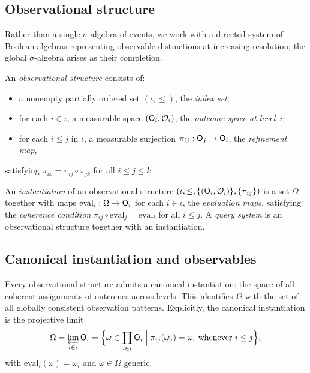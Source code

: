 \subsection{Observational structure}

Rather than a single $\sigma$-algebra of events, we work with a directed system of Boolean algebras representing observable distinctions at increasing resolution; the global $\sigma$-algebra arises as their completion.

\begin{definition}
\label{def:obs-structure}
An \emph{observational structure} consists of:
\begin{itemize}[noitemsep]
  \item a nonempty partially ordered set $(\iota, \leq)$, the \emph{index set};
  \item for each $i \in \iota$, a measurable space $(\mathsf{O}_{i}, \mathcal{O}_i)$,
    the \emph{outcome space at level~$i$};
  \item for each $i \leq j$ in $\iota$, a measurable surjection
    $\pi_{ij} : \mathsf{O}_{j} \to \mathsf{O}_{i}$, the \emph{refinement map},
\end{itemize}
satisfying $\pi_{ik} = \pi_{ij} \circ \pi_{jk}$ for all $i \leq j \leq k$.
\end{definition}

\begin{definition}
\label{def:query-system}
An \emph{instantiation} of an observational structure $(\iota, \leq, \{(\mathsf{O}_{i}, \mathcal{O}_i)\}, \{\pi_{ij}\})$ is a set $\Omega$ together with maps $\mathrm{eval}_i : \Omega \to \mathsf{O}_{i}$ for each $i \in \iota$, the \emph{evaluation maps}, satisfying the \emph{coherence condition} $\pi_{ij} \circ \mathrm{eval}_j = \mathrm{eval}_i$ for all $i \leq j$. A \emph{query system} is an observational structure together with an instantiation.
\end{definition}

\subsection{Canonical instantiation and observables}

Every observational structure admits a canonical instantiation: the space of all coherent assignments of outcomes across levels.  This identifies $\Omega$ with the set of all globally consistent observation patterns.  Explicitly, the canonical instantiation is the projective limit
\[
  \Omega
  = \varprojlim_{i \in \iota} \mathsf{O}_{i} = \Bigl\{
      \omega \in \prod_{i \in \iota} \mathsf{O}_{i}
      \;\Big|\;
      \pi_{ij}(\omega_j) = \omega_i \text{ whenever } i \leq j
    \Bigr\},
\]
with $\mathrm{eval}_i(\omega) = \omega_i$ and  $\omega \in \Omega$ generic.

